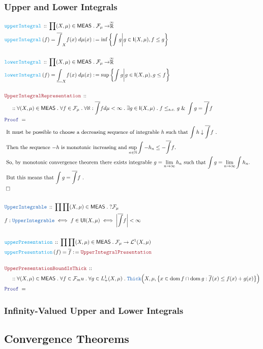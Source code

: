\documentclass[12pt]{scrartcl}
\newcommand{\TYPE}[1]{\textcolor{NavyBlue}{\mathtt{#1}}}
\newcommand{\FUNC}[1]{\textcolor{Cerulean}{\mathtt{#1}}}
\newcommand{\LOGIC}[1]{\textcolor{Blue}{\mathtt{#1}}}
\newcommand{\THM}[1]{\textcolor{Maroon}{\mathtt{#1}}}
\renewcommand{\.}{\; . \;}
\newcommand{\de}{: \kern 0.1pc =}
\newcommand{\Act}[1]{\left( #1 \right)}
\newcommand{\Theorem}[2]{& \THM{#1} \, :: \, #2 \\ & \Proof = \\ }
\newcommand{\DeclareType}[2]{& \TYPE{#1} \, :: \, #2 \\}
\newcommand{\DefineNamedType}[4]{& #1 : \TYPE{#2} \iff #3 \iff #4 \\}
\newcommand{\DeclareFunc}[2]{& \FUNC{#1} \, :: \, #2 \\}
\newcommand{\DefineNamedFunc}[4]{&  \FUNC{#1}\Act{#2} = #3 \de #4 \\}
\newcommand{\NewLine}{\\ & \kern 1pc}
\newcommand{\Page}[1]{ \begin{align*} #1 \end{align*}   }
\renewcommand{\And}{\; \& \;}
\newcommand{\Nat}{\mathbb{N} }
\newcommand{\EReals}{\stackrel{\mathclap{\infty}}{\mathbb{R}}}
\newcommand{\QED}{\; \square}
\newcommand{\EndProof}{& \QED \\}
\newcommand{\Proof}{\LOGIC{Proof} \; }
\newcommand{\Explain}[1]{& \text{#1.} \\}
\DeclareMathOperator*{\dom}{dom}
\renewcommand{\L}{\mathcal{L}}
\renewcommand{\L}{\mathcal{L}}
\renewcommand{\ae}{\mathrm{a.e.}}
\newcommand{\Integrable}{\mathsf{I}}
\newcommand{\F}{\mathcal{F}}
\newcommand{\MEAS}{\mathsf{MEAS}}
\begin{document}
\subsubsection{Upper and Lower Integrals}
\Page{
	\DeclareFunc{upperIntegral}
	{
		\prod (X,\mu) \in \MEAS \. \F_\mu \to \EReals
	}
	\DefineNamedFunc{upperIntegral}{f}{\overline{\int}_X f(x) \; d\mu(x)}
	{
		\inf \left\{ \int g \bigg| g \in \Integrable(X,\mu), f \le g \right\}
	}
	\\
	\DeclareFunc{lowerIntegral}
	{
		\prod (X,\mu) \in \MEAS \. \F_\mu \to \EReals
	}
	\DefineNamedFunc{lowerIntegral}{f}{\underline{\int}_X f(x) \; d\mu(x)}
	{
		\sup \left\{ \int g \bigg| g \in \Integrable(X,\mu), g \le f \right\}
	}
	\\
	\Theorem{UpperIntegralRepresentation}
	{
		\NewLine ::		
		\forall (X,\mu) \in \MEAS\.
		\forall f \in \F_\mu \.
		\forall \aleph : \overline{\int}f  d\mu < \infty \.
		\exists g \in \Integrable(X,\mu) \.
		f \le_{\ae} g \And \int g  = \overline{\int} f 
	}
	\Explain{ 
		It must be possible to choose a decreasing sequence of integrable $h$ such that
		$\int h \downarrow \overline{\int} f $ }
	\Explain{ 
		Then the sequence $-h$ is monotonic increasing and 
		$\sup_{n \in \Nat} \int -h_n \le -\overline{\int} f $}
	\Explain{
		So, by monotonic convergence theorem there exists integrable $g = \lim_{n \to \infty} h_n$
		such that $\int g = \lim_{n \to \infty}\int h_n$}
	\Explain{
		But this means that $\int g = \overline{\int} f  $
	}
	\EndProof
	\\
	\DeclareType{UpperIntegrable}{\prod \prod (X,\mu) \in \MEAS \. ?\F_\mu }
	\DefineNamedType{f}{UpperIntegrable}{f \in \mathsf{UI}(X,\mu)}{\left| \overline{\int} f \right| < \infty}
	\\
	\DeclareFunc{upperPresentation}{\prod \prod (X,\mu) \in \MEAS \. \F_\mu \to \L^1(X,\mu) }
	\DefineNamedFunc{upperPresentation}{f}{\overline{f}}{\THM{UpperIntegralPresentation}}
	\\
	\Theorem{UpperPresentationBoundIsThick}
	{
		\NewLine ::		
		\forall (X,\mu) \in \MEAS \.
		\forall f \in \F_mu \.
		\forall g \in L^1_+(X,\mu) \.
		\TYPE{Thick}\Big( X, \mu, \big\{ x \in \dom f \cap \dom g : \overline{f}(x) \le f(x) + g(x)  \big\}  \Big)
	}
}
\newpage
\subsubsection{Infinity-Valued Upper and Lower Integrals}
\newpage
\subsection{Convergence Theorems}
\end{document}

